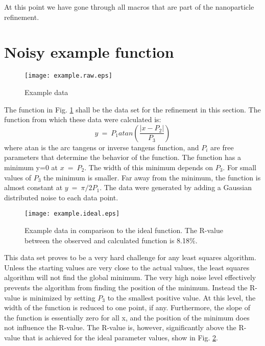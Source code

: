 At this point we have gone through all macros that are part of the 
nanoparticle refinement.





\section{Noisy example function}

\begin{figure}
   \texttt{[image: example.raw.eps]}
   \caption{Example data}
   \label{fexa-arc}
\end{figure}

The function in Fig. \ref{fexa-arc} shall be the data set for the
refinement in this section. The function from which these data were
calculated is:
\begin{equation}
   y ~=~ P_{1} atan \left ( \frac{|x-P_{2}|}{P_{3}}\right)
   \label{eq-exa-arc}
\end{equation}
where atan is the arc tangens or inverse tangens function, and $P_{i}$
are free parameters that determine the behavior of the function. The
function has a minimum y=0 at $x ~=~ P_{2}$. The width of this minimum
depends on $P_{3}$. For small values of $P_{3}$ the minimum is smaller.
Far away from the minimum, the function is almost constant at 
$y ~=~ \pi/2 P_{1}$. The data were generated by adding a Gaussian 
distributed noise to each data point.

\begin{figure}
   \texttt{[image: example.ideal.eps]}
   \caption{Example data in comparison to the ideal function. The
    R-value between the observed and calculated function is 8.18\%.}
   \label{fexa-ideal}
\end{figure}

This data set proves to be a very hard challenge for any least squares
algorithm. Unless the starting values are very close to the actual
values, the least squares algorithm will not find the global minimum.
The very high noise level effectively prevents the algorithm from
finding the position of the minimum. Instead the R-value is minimized
by setting $P_{3}$ to the smallest positive value. At this level, the
width of the function is reduced to one point, if any. Furthermore, the
slope of the function is essentially zero for all x, and the position of
the minimum does not influence the R-value. The R-value is, however,
significantly above the R-value that is achieved for the ideal 
parameter values, show in Fig. \ref{fexa-ideal}.

